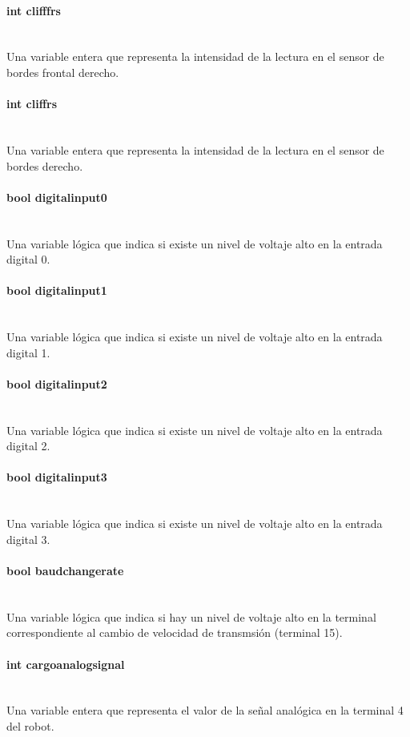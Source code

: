 \documentclass[letterpaper,openright,12pt]{book}
\begin{document}
\paragraph{int clifffrs}\mbox{}\\
Una variable entera que representa la intensidad de la lectura en el sensor de bordes frontal derecho.
\paragraph{int cliffrs}\mbox{}\\
Una variable entera que representa la intensidad de la lectura en el sensor de bordes derecho.
\paragraph{bool digitalinput0}\mbox{}\\
Una variable lógica que indica si existe un nivel de voltaje alto en la entrada digital 0.
\paragraph{bool digitalinput1}\mbox{}\\
Una variable lógica que indica si existe un nivel de voltaje alto en la entrada digital 1.
\paragraph{bool digitalinput2}\mbox{}\\
Una variable lógica que indica si existe un nivel de voltaje alto en la entrada digital 2.
\paragraph{bool digitalinput3}\mbox{}\\
Una variable lógica que indica si existe un nivel de voltaje alto en la entrada digital 3.
\paragraph{bool baudchangerate}\mbox{}\\
Una variable lógica que indica si hay un nivel de voltaje alto en la terminal correspondiente al cambio de velocidad de transmsión (terminal 15).
\paragraph{int cargoanalogsignal}\mbox{}\\
Una variable entera que representa el valor de la señal analógica en la terminal 4 del robot.
\end{document}

